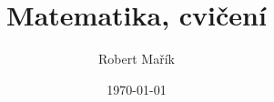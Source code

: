 \documentclass{article}
\begin{document}
\title{Matematika, cvičení}
\author{Robert Mařík}
\date{\today}


\maketitle
\tableofcontents

\clearpage


\end{document}

